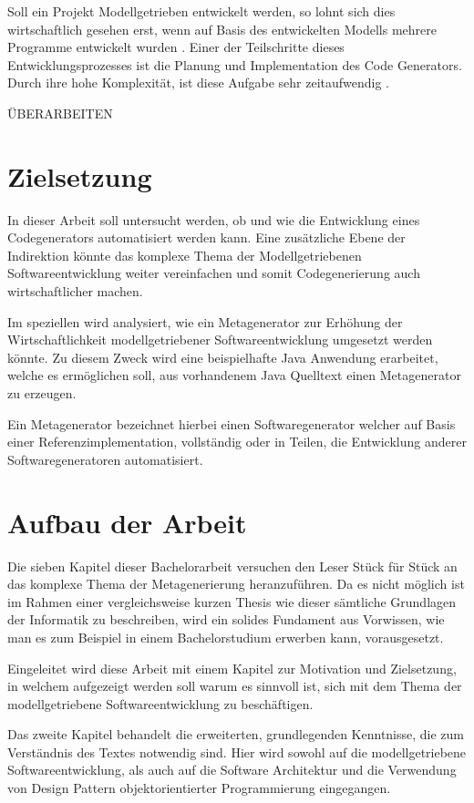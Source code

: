 \documentclass[12pt,oneside,a4paper,parskip]{scrbook}
\begin{document}
Soll ein Projekt Modellgetrieben entwickelt werden, so lohnt sich dies wirtschaftlich gesehen erst, wenn auf Basis des entwickelten Modells mehrere Programme entwickelt wurden \cite{}. Einer der Teilschritte dieses Entwicklungsprozesses ist die Planung und Implementation des Code Generators. Durch ihre hohe Komplexität, ist diese Aufgabe sehr zeitaufwendig \cite{}.

ÜBERARBEITEN
\section{Zielsetzung}

In dieser Arbeit soll untersucht werden, ob und wie die Entwicklung eines Codegenerators automatisiert werden kann. Eine zusätzliche Ebene der Indirektion könnte das komplexe Thema der Modellgetriebenen Softwareentwicklung weiter vereinfachen und somit Codegenerierung auch wirtschaftlicher machen.

Im speziellen wird analysiert, wie ein Metagenerator zur Erhöhung der Wirtschaftlichkeit modellgetriebener Softwareentwicklung umgesetzt werden könnte. Zu diesem Zweck wird eine beispielhafte Java Anwendung erarbeitet, welche es ermöglichen soll, aus vorhandenem Java Quelltext einen Metagenerator zu erzeugen.

Ein Metagenerator bezeichnet hierbei einen Softwaregenerator welcher auf Basis einer Referenzimplementation, vollständig oder in Teilen, die Entwicklung anderer Softwaregeneratoren automatisiert.

\section{Aufbau der Arbeit}

Die sieben Kapitel dieser Bachelorarbeit versuchen den Leser Stück für Stück an das komplexe Thema der Metagenerierung heranzuführen. Da es nicht möglich ist im Rahmen einer vergleichsweise kurzen Thesis wie dieser sämtliche Grundlagen der Informatik zu beschreiben, wird ein solides Fundament aus Vorwissen, wie man es zum Beispiel in einem Bachelorstudium erwerben kann, vorausgesetzt.

Eingeleitet wird diese Arbeit mit einem Kapitel zur Motivation und Zielsetzung, in welchem aufgezeigt werden soll warum es sinnvoll ist, sich mit dem Thema der modellgetriebene Softwareentwicklung zu beschäftigen. 

Das zweite Kapitel behandelt die erweiterten, grundlegenden Kenntnisse, die zum Verständnis des Textes notwendig sind. Hier wird sowohl auf die modellgetriebene Softwareentwicklung, als auch auf die Software Architektur und die Verwendung von Design Pattern objektorientierter Programmierung eingegangen.
\end{document}
